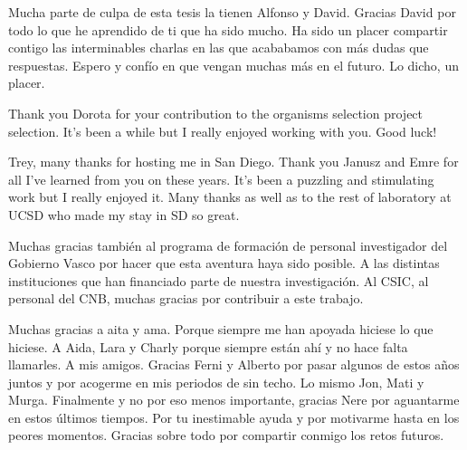 {Mucha parte de culpa de esta tesis la tienen Alfonso y David. Gracias David por todo lo que he aprendido de ti que ha sido mucho. Ha sido un placer compartir contigo las interminables charlas en las que acababamos con más dudas que respuestas. Espero y confío en que vengan muchas más en el futuro. Lo dicho, un placer.

Thank you Dorota for your contribution to the organisms selection project selection. It's been a while but I really enjoyed working with you. Good luck!  

Trey, many thanks for hosting me in San Diego. Thank you Janusz and Emre for all I’ve learned from you on these years. It’s been a puzzling and stimulating work but I really enjoyed it. Many thanks as well as to the rest of laboratory at UCSD who made my stay in SD so great.

Muchas gracias también al programa de formación de personal investigador del Gobierno Vasco por hacer que esta aventura haya sido posible. A las distintas instituciones que han financiado parte de nuestra investigación. Al CSIC, al personal del CNB, muchas gracias por contribuir a este trabajo.

Muchas gracias a aita y ama. Porque siempre me han apoyada hiciese lo que hiciese. A Aida, Lara y Charly porque siempre están ahí y no hace falta llamarles. A mis amigos. Gracias Ferni y Alberto por pasar algunos de estos años juntos y por acogerme en mis periodos de sin techo. Lo mismo Jon, Mati y Murga. Finalmente y no por eso menos importante, gracias Nere por aguantarme en estos últimos tiempos. Por tu inestimable ayuda y por motivarme hasta en los peores momentos. Gracias sobre todo por compartir conmigo los retos futuros.
 
}
\clearpage  %
